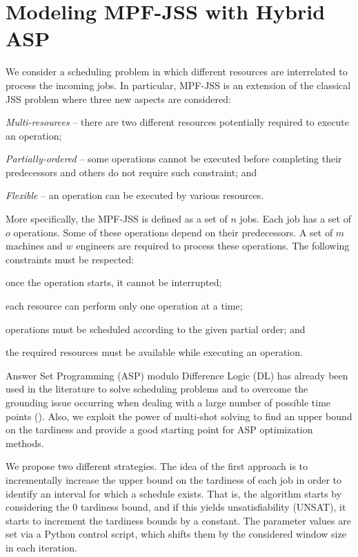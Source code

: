 \documentclass[submission,copyright,creativecommons]{eptcs}
\begin{document}
\section{Modeling MPF-JSS with Hybrid ASP}\label{sec:aspmodeling}
We consider a scheduling problem in which different resources are interrelated to process the incoming jobs. In particular, MPF-JSS is an extension of the classical JSS problem where three new aspects are considered: 
\begin{enumerate*}[label=\emph{(\alph*)}]
	\item \emph{Multi-resources} -- there are two different resources potentially required to execute an operation; 
	\item \emph{Partially-ordered} -- some operations cannot be executed before completing their predecessors and others do not require such constraint; and
	\item \emph{Flexible} -- an operation can be executed by various resources. 
\end{enumerate*}
More specifically, the MPF-JSS is defined as a set of $n$ jobs. Each job has a set of $o$ operations. Some of these operations depend on their predecessors. A set of $m$ machines and $w$ engineers are required to process these operations. The following constraints must be respected:
\begin{enumerate*}[label=\emph{(\roman*)}]
  \item once the operation starts, it cannot be interrupted;
  \item each resource can perform only one operation at a time;
  \item operations must be scheduled according to the given partial order; and
  \item the required resources must be available while executing an operation.
\end{enumerate*}



Answer Set Programming (ASP) modulo Difference Logic (DL) has already been used in the literature to solve scheduling problems and to overcome the grounding issue occurring when dealing with a large number of possible time points (\cite{DBLP:conf/lpnmr/AbelsJOSTW19}). Also, we exploit the power of multi-shot solving to find an upper bound on the tardiness and provide a good starting point for ASP optimization methods. 

We propose two different strategies. The idea of the first approach is to incrementally increase the upper bound on the tardiness of each job in order to identify an interval for which a schedule exists.
%
That is, the algorithm starts by considering the $0$ tardiness bound, and if this yields unsatisfiability (UNSAT), it starts to increment the tardiness bounds by a constant. The parameter values are set via a Python control script, which shifts them by the considered window size in each iteration. 
\end{document}
